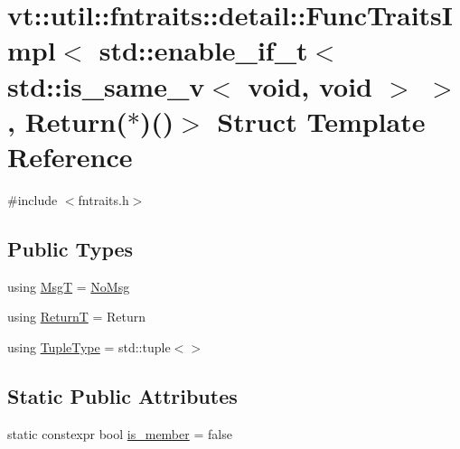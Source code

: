 \hypertarget{structvt_1_1util_1_1fntraits_1_1detail_1_1_func_traits_impl_3_01std_1_1enable__if__t_3_01std_1_1ad5feb26a13a77ffcef5dc070c332fb3}{}\section{vt\+:\+:util\+:\+:fntraits\+:\+:detail\+:\+:Func\+Traits\+Impl$<$ std\+:\+:enable\+\_\+if\+\_\+t$<$ std\+:\+:is\+\_\+same\+\_\+v$<$ void, void $>$ $>$, Return($\ast$)()$>$ Struct Template Reference}
\label{structvt_1_1util_1_1fntraits_1_1detail_1_1_func_traits_impl_3_01std_1_1enable__if__t_3_01std_1_1ad5feb26a13a77ffcef5dc070c332fb3}


{\ttfamily \#include $<$fntraits.\+h$>$}

\subsection*{Public Types}
\begin{DoxyCompactItemize}
\item 
using \hyperlink{structvt_1_1util_1_1fntraits_1_1detail_1_1_func_traits_impl_3_01std_1_1enable__if__t_3_01std_1_1ad5feb26a13a77ffcef5dc070c332fb3_a09e43dec76f0534e7031572ecd3b5dd7}{MsgT} = \hyperlink{structvt_1_1util_1_1fntraits_1_1detail_1_1_no_msg}{No\+Msg}
\item 
using \hyperlink{structvt_1_1util_1_1fntraits_1_1detail_1_1_func_traits_impl_3_01std_1_1enable__if__t_3_01std_1_1ad5feb26a13a77ffcef5dc070c332fb3_a88453b0f708f1b1ec93369ee9aa75f86}{ReturnT} = Return
\item 
using \hyperlink{structvt_1_1util_1_1fntraits_1_1detail_1_1_func_traits_impl_3_01std_1_1enable__if__t_3_01std_1_1ad5feb26a13a77ffcef5dc070c332fb3_a6ce8162e330b061d450abbd514cfbf01}{Tuple\+Type} = std\+::tuple$<$$>$
\end{DoxyCompactItemize}
\subsection*{Static Public Attributes}
\begin{DoxyCompactItemize}
\item 
static constexpr bool \hyperlink{structvt_1_1util_1_1fntraits_1_1detail_1_1_func_traits_impl_3_01std_1_1enable__if__t_3_01std_1_1ad5feb26a13a77ffcef5dc070c332fb3_add80d665c7fc3d31c661f1087f3c9143}{is\+\_\+member} = false
\end{DoxyCompactItemize}


